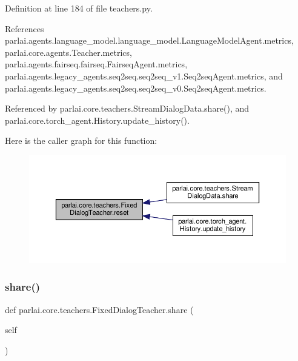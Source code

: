 Definition at line 184 of file teachers.\+py.



References parlai.\+agents.\+language\+\_\+model.\+language\+\_\+model.\+Language\+Model\+Agent.\+metrics, parlai.\+core.\+agents.\+Teacher.\+metrics, parlai.\+agents.\+fairseq.\+fairseq.\+Fairseq\+Agent.\+metrics, parlai.\+agents.\+legacy\+\_\+agents.\+seq2seq.\+seq2seq\+\_\+v1.\+Seq2seq\+Agent.\+metrics, and parlai.\+agents.\+legacy\+\_\+agents.\+seq2seq.\+seq2seq\+\_\+v0.\+Seq2seq\+Agent.\+metrics.



Referenced by parlai.\+core.\+teachers.\+Stream\+Dialog\+Data.\+share(), and parlai.\+core.\+torch\+\_\+agent.\+History.\+update\+\_\+history().

Here is the caller graph for this function\+:
\nopagebreak
\begin{figure}[H]
\begin{center}
\leavevmode
\includegraphics[width=350pt]{classparlai_1_1core_1_1teachers_1_1FixedDialogTeacher_af0e1160f17d43ace896f71c190e4e5ec_icgraph}
\end{center}
\end{figure}
\mbox{\label{classparlai_1_1core_1_1teachers_1_1FixedDialogTeacher_af1501d26676b7cf0ed8f41d51c31e686}} 
\subsubsection{\texorpdfstring{share()}{share()}}
{\footnotesize\ttfamily def parlai.\+core.\+teachers.\+Fixed\+Dialog\+Teacher.\+share (\begin{DoxyParamCaption}\item[{}]{self }\end{DoxyParamCaption})}

